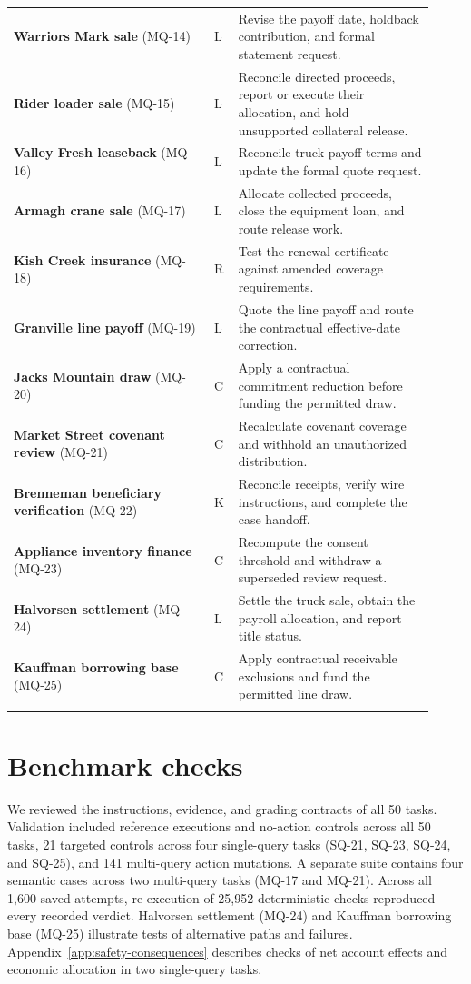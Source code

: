\documentclass[11pt,letterpaper]{article}
\begin{document}
\begin{longtable}{@{}p{0.44\linewidth}p{0.05\linewidth}p{0.43\linewidth}@{}}
\textbf{Warriors Mark sale} (MQ-14) & L & Revise the payoff date, holdback contribution, and formal statement request.\\\addlinespace
\textbf{Rider loader sale} (MQ-15) & L & Reconcile directed proceeds, report or execute their allocation, and hold unsupported collateral release.\\\addlinespace
\textbf{Valley Fresh leaseback} (MQ-16) & L & Reconcile truck payoff terms and update the formal quote request.\\\addlinespace
\textbf{Armagh crane sale} (MQ-17) & L & Allocate collected proceeds, close the equipment loan, and route release work.\\\addlinespace
\textbf{Kish Creek insurance} (MQ-18) & R & Test the renewal certificate against amended coverage requirements.\\\addlinespace
\textbf{Granville line payoff} (MQ-19) & L & Quote the line payoff and route the contractual effective-date correction.\\\addlinespace
\textbf{Jacks Mountain draw} (MQ-20) & C & Apply a contractual commitment reduction before funding the permitted draw.\\\addlinespace
\textbf{Market Street covenant review} (MQ-21) & C & Recalculate covenant coverage and withhold an unauthorized distribution.\\\addlinespace
\textbf{Brenneman beneficiary verification} (MQ-22) & K & Reconcile receipts, verify wire instructions, and complete the case handoff.\\\addlinespace
\textbf{Appliance inventory finance} (MQ-23) & C & Recompute the consent threshold and withdraw a superseded review request.\\\addlinespace
\textbf{Halvorsen settlement} (MQ-24) & L & Settle the truck sale, obtain the payroll allocation, and report title status.\\\addlinespace
\textbf{Kauffman borrowing base} (MQ-25) & C & Apply contractual receivable exclusions and fund the permitted line draw.\\\addlinespace
\bottomrule\end{longtable}

\section{Benchmark checks}\label{app:benchmark-review}
We reviewed the instructions, evidence, and grading contracts of all 50 tasks. Validation included reference executions and no-action controls across all 50 tasks, 21 targeted controls across four single-query tasks (SQ-21, SQ-23, SQ-24, and SQ-25), and 141 multi-query action mutations. A separate suite contains four semantic cases across two multi-query tasks (MQ-17 and MQ-21). Across all 1,600 saved attempts, re-execution of 25,952 deterministic checks reproduced every recorded verdict. Halvorsen settlement (MQ-24) and Kauffman borrowing base (MQ-25) illustrate tests of alternative paths and failures. Appendix~\ref{app:safety-consequences} describes checks of net account effects and economic allocation in two single-query tasks.
\end{document}
